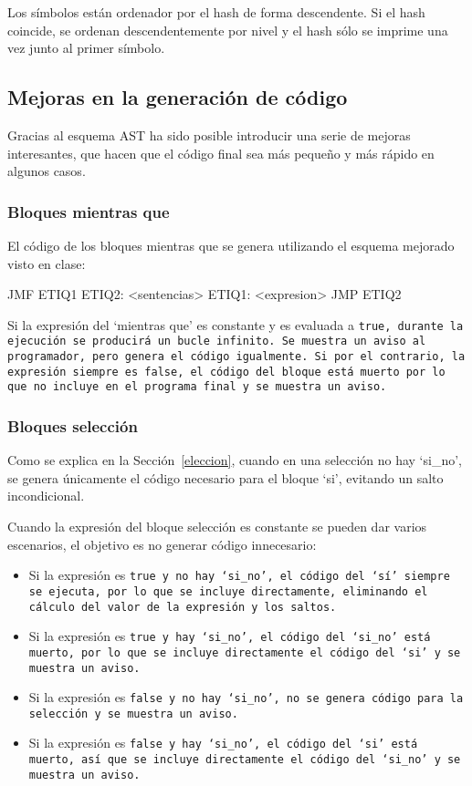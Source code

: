 Los símbolos están ordenador por el hash de forma descendente. Si el hash coincide, se ordenan descendentemente por nivel y el hash sólo se imprime una vez junto al primer símbolo.


\subsection{Mejoras en la generación de código}
Gracias al esquema AST ha sido posible introducir una serie de mejoras interesantes, que hacen que el código final sea más pequeño y más rápido en algunos casos.

\subsubsection{Bloques mientras que}
El código de los bloques mientras que se genera utilizando el esquema mejorado visto en clase:

\begin{codigo}
        JMF ETIQ1
        ETIQ2:
          		<sentencias>
        ETIQ1:
        		<expresion>
        		JMP ETIQ2
\end{codigo}

Si la expresión del `mientras que' es constante y es evaluada a \tt{true}, durante la ejecución se producirá un bucle infinito. Se muestra un aviso al programador, pero genera el código igualmente. Si por el contrario, la expresión siempre es \tt{false}, el código del bloque está muerto por lo que no incluye en el programa final y se muestra un aviso.

\subsubsection{Bloques selección}
Como se explica en la Sección~\ref{eleccion}, cuando en una selección no hay `si\_no', se genera únicamente el código necesario para el bloque `si', evitando un salto incondicional.

Cuando la expresión del bloque selección es constante se pueden dar varios escenarios, el objetivo es no generar código innecesario:

\begin{itemize}
    \item Si la expresión es \tt{true} y no hay `si\_no', el código del `sí' siempre se ejecuta, por lo que se incluye directamente, eliminando el cálculo del valor de la expresión y los saltos.
    \item Si la expresión es \tt{true} y hay `si\_no', el código del `si\_no' está muerto, por lo que se incluye directamente el código del `si' y se muestra un aviso.
    \item Si la expresión es \tt{false} y no hay `si\_no', no se genera código para la selección y se muestra un aviso.
    \item Si la expresión es \tt{false} y hay `si\_no', el código del `si' está muerto, así que se incluye directamente el código del `si\_no' y se muestra un aviso.
\end{itemize}

